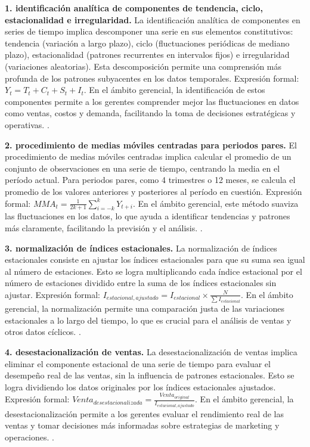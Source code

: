 {\textbf{1. identificación analítica de componentes de tendencia, ciclo, estacionalidad e irregularidad.} La identificación analítica de componentes en series de tiempo implica descomponer una serie en sus elementos constitutivos: tendencia (variación a largo plazo), ciclo (fluctuaciones periódicas de mediano plazo), estacionalidad (patrones recurrentes en intervalos fijos) e irregularidad (variaciones aleatorias). Esta descomposición permite una comprensión más profunda de los patrones subyacentes en los datos temporales. Expresión formal: $Y_t = T_t + C_t + S_t + I_t$. En el ámbito gerencial, la identificación de estos componentes permite a los gerentes comprender mejor las fluctuaciones en datos como ventas, costos y demanda, facilitando la toma de decisiones estratégicas y operativas. \citep{anderson2012,lind2012,wackerly2010}.

\textbf{2. procedimiento de medias móviles centradas para periodos pares.} El procedimiento de medias móviles centradas implica calcular el promedio de un conjunto de observaciones en una serie de tiempo, centrando la media en el período actual. Para periodos pares, como 4 trimestres o 12 meses, se calcula el promedio de los valores anteriores y posteriores al período en cuestión. Expresión formal: $MMA_t = \frac{1}{2k+1} \sum_{i=-k}^{k} Y_{t+i}$. En el ámbito gerencial, este método suaviza las fluctuaciones en los datos, lo que ayuda a identificar tendencias y patrones más claramente, facilitando la previsión y el análisis. \citep{anderson2012,lind2012,wackerly2010}.

\textbf{3. normalización de índices estacionales.} La normalización de índices estacionales consiste en ajustar los índices estacionales para que su suma sea igual al número de estaciones. Esto se logra multiplicando cada índice estacional por el número de estaciones dividido entre la suma de los índices estacionales sin ajustar. Expresión formal: $I_{estacional, ajustado} = I_{estacional} \times \frac{N}{\sum I_{estacional}}$. En el ámbito gerencial, la normalización permite una comparación justa de las variaciones estacionales a lo largo del tiempo, lo que es crucial para el análisis de ventas y otros datos cíclicos. \citep{anderson2012,lind2012,wackerly2010}.

\textbf{4. desestacionalización de ventas.} La desestacionalización de ventas implica eliminar el componente estacional de una serie de tiempo para evaluar el desempeño real de las ventas, sin la influencia de patrones estacionales. Esto se logra dividiendo los datos originales por los índices estacionales ajustados. Expresión formal: $Venta_{desestacionalizada} = \frac{Venta_{original}}{I_{estacional, ajustado}}$. En el ámbito gerencial, la desestacionalización permite a los gerentes evaluar el rendimiento real de las ventas y tomar decisiones más informadas sobre estrategias de marketing y operaciones. \citep{anderson2012,lind2012,wackerly2010}.

}
